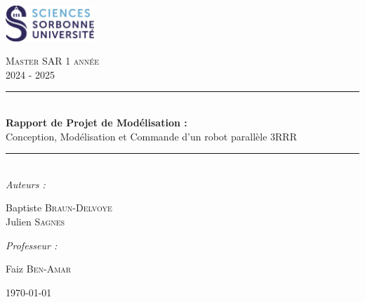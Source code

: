 \documentclass[a4paper, 11pt]{report}
\begin{document}


\begin{titlepage}
    \newcommand{\HRule}{\rule{\linewidth}{0.5mm}}
    \begin{center}
        \begin{minipage}{1\linewidth}
            \begin{flushleft}
                \hspace{4.5cm}
                \includegraphics[width=0.25\textwidth]{Figures/SORBONNE_FAC_SCIENCES_DEF_CMJN.pdf}
            \end{flushleft}
        \end{minipage}

        \vspace{1.5cm}
        
        \textsc{\Large{}Master SAR 1 année} \\[0.5cm]
        \textsc{\large{}2024 - 2025} \\[0.5cm]

        \HRule \\[0.6cm]
        {\huge\bfseries{}Rapport de Projet de Modélisation :} \\ \LARGE{Conception, Modélisation et Commande d'un robot parallèle 3RRR} \\[0.25cm]
        \HRule \\[1.5cm]


        \Large\textit{Auteurs :}\\
        \begin{center}
            Baptiste \textsc{Braun-Delvoye}\\
            Julien \textsc{Sagnes}
        \end{center}

        \hfill

        \Large\textit{Professeur :}\\
        \begin{center}
            Faiz \textsc{Ben-Amar}
        \end{center}
        \vspace{1cm}
        {\large\today} \\[2cm]
    \end{center}

    \vfill
\end{titlepage}
\end{document}
